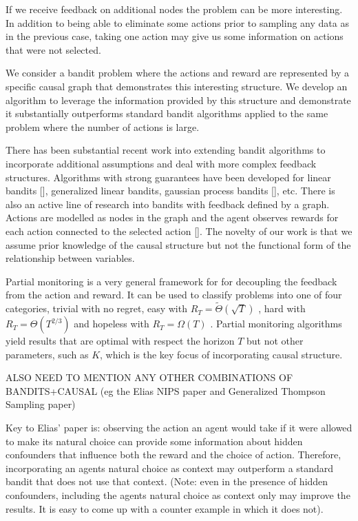 \documentclass{article}
\newcommand{\bigtheta}[1]{\Theta\left( #1 \right)}
\newcommand{\bigthetatilde}[1]{\tilde{\Theta}\left( #1 \right)}
\newcommand{\bigomega}[1]{\Omega\left( #1 \right)}
\theoremstyle{plain}
\theoremstyle{definition}
\begin{document}
If we receive feedback on additional nodes the problem can be more interesting. In addition to being able to eliminate some actions prior to sampling any data as in the previous case, taking one action may give us some information on actions that were not selected. 

We consider a bandit problem where the actions and reward are represented by a specific causal graph that demonstrates this interesting structure. We develop an algorithm to leverage the information provided by this structure and demonstrate it substantially outperforms standard bandit algorithms applied to the same problem where the number of actions is large.

There has been substantial recent work into extending bandit algorithms to incorporate additional assumptions and deal with more complex feedback structures. Algorithms with strong guarantees have been developed for linear bandits [], generalized linear bandits, gaussian process bandits [], etc. There is also an active line of research into bandits with feedback defined by a graph. Actions are modelled as nodes in the graph and the agent observes rewards for each action connected to the selected action []. The novelty of our work is that we assume prior knowledge of the causal structure but not the functional form of the relationship between variables.   

Partial monitoring is a very general framework for for decoupling the feedback from the action and reward. It can be used to classify problems into one of four categories, trivial with no regret, easy with $R_T = \bigthetatilde{\sqrt{T}}$ , hard with $R_T = \bigtheta{T^{2/3}}$ and hopeless with $R_T = \bigomega{T}$ \cite{Bartok2014}. Partial monitoring algorithms yield results that are optimal with respect the horizon $T$ but not other parameters, such as $K$, which is the key focus of incorporating causal structure. 

ALSO NEED TO MENTION ANY OTHER COMBINATIONS OF BANDITS+CAUSAL (eg the Elias NIPS paper and Generalized Thompson Sampling paper)

Key to Elias' paper is: observing the action an agent would take if it were allowed to make its natural choice can provide some information about hidden confounders that influence both the reward and the choice of action. Therefore, incorporating an agents natural choice as context may outperform a standard bandit that does not use that context. (Note: even in the presence of hidden confounders, including the agents natural choice as context only may improve the results. It is easy to come up with a counter example in which it does not).
\end{document}
